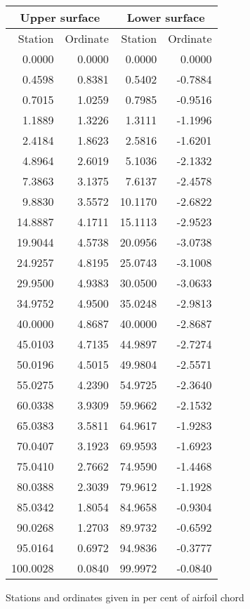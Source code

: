 \documentclass[11pt]{book}
\begin{document}
 \begin{tabular}{|r|r|r|r|} \hline 
 \multicolumn{2}{|c|}{Upper surface} & \multicolumn{2}{|c|}{Lower surface} \\
 \hline
 Station & Ordinate & Station & Ordinate \\
 \hline
0.0000 & 0.0000 & 0.0000 & 0.0000 \\
0.4598 & 0.8381 & 0.5402 & -0.7884 \\
0.7015 & 1.0259 & 0.7985 & -0.9516 \\
1.1889 & 1.3226 & 1.3111 & -1.1996 \\
2.4184 & 1.8623 & 2.5816 & -1.6201 \\
4.8964 & 2.6019 & 5.1036 & -2.1332 \\
7.3863 & 3.1375 & 7.6137 & -2.4578 \\
9.8830 & 3.5572 & 10.1170 & -2.6822 \\
14.8887 & 4.1711 & 15.1113 & -2.9523 \\
19.9044 & 4.5738 & 20.0956 & -3.0738 \\
24.9257 & 4.8195 & 25.0743 & -3.1008 \\
29.9500 & 4.9383 & 30.0500 & -3.0633 \\
34.9752 & 4.9500 & 35.0248 & -2.9813 \\
40.0000 & 4.8687 & 40.0000 & -2.8687 \\
45.0103 & 4.7135 & 44.9897 & -2.7274 \\
50.0196 & 4.5015 & 49.9804 & -2.5571 \\
55.0275 & 4.2390 & 54.9725 & -2.3640 \\
60.0338 & 3.9309 & 59.9662 & -2.1532 \\
65.0383 & 3.5811 & 64.9617 & -1.9283 \\
70.0407 & 3.1923 & 69.9593 & -1.6923 \\
75.0410 & 2.7662 & 74.9590 & -1.4468 \\
80.0388 & 2.3039 & 79.9612 & -1.1928 \\
85.0342 & 1.8054 & 84.9658 & -0.9304 \\
90.0268 & 1.2703 & 89.9732 & -0.6592 \\
95.0164 & 0.6972 & 94.9836 & -0.3777 \\
100.0028 & 0.0840 & 99.9972 & -0.0840 \\
 \hline 
 \end{tabular}
 \vspace{8mm}

Stations and ordinates given in per cent of airfoil chord
\end{document}

